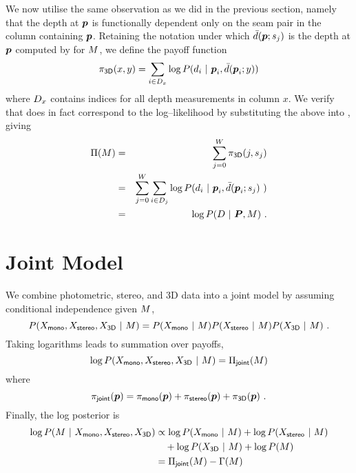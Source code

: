 We now utilise the same observation as we did in the previous section,
namely that the depth at $\Pixel$ is functionally dependent only on
the seam pair in the column containing $\Pixel$. Retaining the
notation under which $\ComputedDepth(\Pixel;\seam_j)$ is the depth at
$\Pixel$ computed by  for $\Scene$, we
define the payoff function
\begin{equation}
  \label{eq:depth-payoffs}
  \DepthPayoff(x,y) = 
  \sum_{i\in\Depths_x} \log P(\Depth_i~|~\Pixel_i,\ComputedDepth(\Pixel_i;y))
\end{equation}
where $\Depths_x$ contains indices for all depth measurements in
column $x$. We verify that  does in fact
correspond to the log--likelihood  by
substituting the above into , giving
\begin{eqnarray}
  \ScenePayoff(\Scene) &=& 
    \sum_{j=0}^W \DepthPayoff(j,\seam_j)\\
  &=&
    \sum_{j=0}^W \sum_{i\in\Depths_j} 
    \log P(\Depth_i~|~\Pixel_i,\ComputedDepth(\Pixel_i;\seam_j)~)\\
  &=&
    \log P(\Depths ~|~ \Pixels, \Scene)~.
\end{eqnarray}

\section{Joint Model}
We combine photometric, stereo, and 3D data into a joint model by
assuming conditional independence given $\Scene$,
\begin{equation}
  P(X_{\textsf{mono}}, X_{\textsf{stereo}}, X_{\textsf{3D}} ~|~ \Scene)
  =
    P(X_{\textsf{mono}} ~|~ \Scene)
    P(X_{\textsf{stereo}} ~|~ \Scene)
    P(X_{\textsf{3D}} ~|~ \Scene) ~.
\end{equation}
Taking logarithms leads to summation over payoffs,
\begin{equation}
  \log P(X_{\textsf{mono}}, X_{\textsf{stereo}}, X_{\textsf{3D}} ~|~ \Scene)
  = \ScenePayoff_{\textsf{joint}}(\Scene)
\end{equation}
where
\begin{equation}
  \JointPayoff(\Pixel) =
  \MonoPayoff(\Pixel) + 
  \StereoPayoff(\Pixel) +
  \DepthPayoff(\Pixel) ~.
\end{equation}
Finally, the log posterior is
\begin{equation}
\begin{split}
  \log P(\Scene ~|~ X_{\textsf{mono}}, X_{\textsf{stereo}}, X_{\textsf{3D}})
  & \propto
    \log P(X_{\textsf{mono}} ~|~ \Scene)
    +\log P(X_{\textsf{stereo}} ~|~ \Scene) \\
  & \quad + \log P(X_{\textsf{3D}} ~|~ \Scene) + \log P(\Scene)\\
  & = \ScenePayoff_{\textsf{joint}}(\Scene) - \ScenePenalty(\Scene)
\end{split}
\end{equation}

